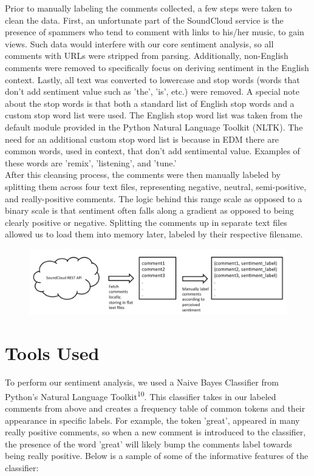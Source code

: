 \documentclass[12pt]{dalcsthesis}
\begin{document}
Prior to manually labeling the comments collected, a few steps were taken to clean the data. First, an unfortunate part of the SoundCloud service is the presence of spammers who tend to comment with links to his/her music, to gain views. Such data would interfere with our core sentiment analysis, so all comments with URLs were stripped from parsing. Additionally, non-English comments were removed to specifically focus on deriving sentiment in the English context. Lastly, all text was converted to lowercase and stop words (words that don't add sentiment value such as 'the', 'is', etc.) were removed. A special note about the stop words is that both a standard list of English stop words and a custom stop word list were used. The English stop word list was taken from the default module provided in the Python Natural Language Toolkit (NLTK). The need for an additional custom stop word list is because in EDM there are common words, used in context, that don't add sentimental value. Examples of these words are 'remix', 'listening', and 'tune.' \\

After this cleansing process, the comments were then manually labeled by splitting them across four text files, representing negative, neutral, semi-positive, and really-positive comments. The logic behind this range scale as opposed to a binary scale is that sentiment often falls along a gradient as opposed to being clearly positive or negative. Splitting the comments up in separate text files allowed us to load them into memory later, labeled by their respective filename.

\begin{figure}[h]
\includegraphics[scale=.40]{training}
\centering
\end{figure}

\section{Tools Used}

To perform our sentiment analysis, we used a Naive Bayes Classifier from Python's Natural Language Toolkit\textsuperscript{10}. This classifier takes in our labeled comments from above and creates a frequency table of common tokens and their appearance in specific labels. For example, the token 'great', appeared in many really positive comments, so when a new comment is introduced to the classifier, the presence of the word 'great' will likely bump the comments label towards being really positive. Below is a sample of some of the informative features of the classifier:
\end{document}
